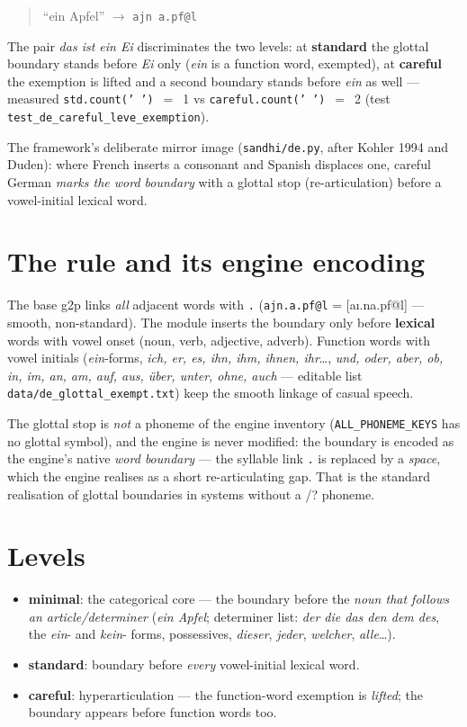 \documentclass[11pt,a4paper]{report}
\newcommand{\smp}[1]{\texttt{#1}}          %
\begin{document}
\begin{quote}\large``ein Apfel'' $\rightarrow$ \smp{ajn a.pf@l}\end{quote}

The pair \emph{das ist ein Ei} discriminates the two levels: at
\textbf{standard} the glottal boundary stands before \emph{Ei} only
(\emph{ein} is a function word, exempted), at \textbf{careful} the
exemption is lifted and a second boundary stands before \emph{ein} as
well --- measured \smp{std.count(' ')}~$=$~1 vs
\smp{careful.count(' ')}~$=$~2 (test
\smp{test\_de\_careful\_leve\_exemption}).

\noindent The framework's deliberate mirror image (\smp{sandhi/de.py}, after
Kohler 1994 and Duden): where French inserts a consonant and Spanish
displaces one, careful German \emph{marks the word boundary} with a glottal
stop (re-articulation) before a vowel-initial lexical word.

\section{The rule and its engine encoding}

The base g2p links \emph{all} adjacent words with \smp{.}
(\smp{ajn.a.pf@l} = [a\i.na.pf@l] — smooth, non-standard). The module
inserts the boundary only before \textbf{lexical} words with vowel onset
(noun, verb, adjective, adverb). Function words with vowel initials
(\emph{ein}-forms, \emph{ich, er, es, ihn, ihm, ihnen, ihr}\dots,
\emph{und, oder, aber, ob, in, im, an, am, auf, aus, \"uber, unter, ohne,
auch} — editable list \smp{data/de\_glottal\_exempt.txt}) keep the smooth
linkage of casual speech.

The glottal stop is \emph{not} a phoneme of the engine inventory
(\smp{ALL\_PHONEME\_KEYS} has no glottal symbol), and the engine is never
modified: the boundary is encoded as the engine's native \emph{word
boundary} — the syllable link \smp{.} is replaced by a \emph{space}, which
the engine realises as a short re-articulating gap. That is the standard
realisation of glottal boundaries in systems without a /?\/ phoneme.

\section{Levels}

\begin{itemize}
  \item \textbf{minimal}: the categorical core — the boundary before the
        \emph{noun that follows an article/determiner} (\emph{ein Apfel};
        determiner list: \emph{der die das den dem des}, the \emph{ein}-
        and \emph{kein}- forms, possessives, \emph{dieser}, \emph{jeder},
        \emph{welcher}, \emph{alle}\dots).
  \item \textbf{standard}: boundary before \emph{every} vowel-initial
        lexical word.
  \item \textbf{careful}: hyperarticulation — the function-word exemption
        is \emph{lifted}; the boundary appears before function words too.
\end{itemize}
\end{document}
